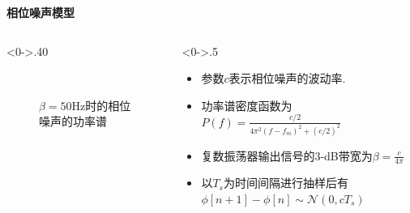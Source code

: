 	\begin{frame}{\textbf{相位噪声模型}}
		\begin{columns}[T] %
			\begin{column}<0->{.40\textwidth}
				\begin{figure}[thpb]
					\centering
					$\quad$\caption{$\beta=50$Hz时的相位噪声的功率谱}
					\label{fig:campus}
				\end{figure}
			\end{column}%
			\hfill%
			\begin{column}<0->{.5\textwidth}
				\begin{itemize}
					\item 参数$c$表示相位噪声的波动率.
					\item 功率谱密度函数为$P(f) = \frac{c/2}{4{{\pi }^{2}}{{(f-{{f}_{m}})}^{2}}+{{\left( c/2 \right)}^{2}}}$
					\item 复数振荡器输出信号的3-dB带宽为$\beta = \frac{c}{4\pi}$ 
					\item 以$T_s$为时间间隔进行抽样后有$\phi[n+1]-\phi[n]\sim\mathcal{N}(0,cT_s)$
				\end{itemize}
			\end{column}%
		\end{columns}
	\end{frame}

